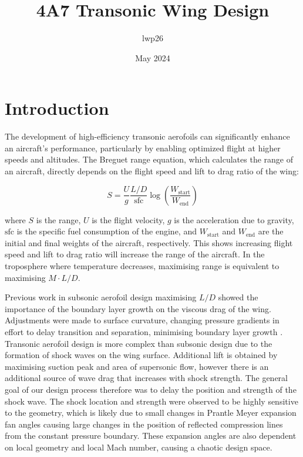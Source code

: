 \documentclass{article}
\begin{document}
\title{4A7 Transonic Wing Design}
\author{lwp26}
\date{May 2024}
\maketitle

\section{Introduction}

The development of high-efficiency transonic aerofoils can significantly enhance an aircraft's performance, particularly by enabling optimized flight at higher speeds and altitudes.
The Breguet range equation, which calculates the range of an aircraft, directly depends on the flight speed and lift to drag ratio of the wing:

\begin{equation}
S = \frac{U}{g}\frac{L/D}{\text{sfc}} \log \left( \frac{W_\text{start}}{W_\text{end}} \right)
\end{equation}

where $S$ is the range, $U$ is the flight velocity, $g$ is the acceleration due to gravity, $\text{sfc}$ is the specific fuel consumption of the engine, and $W_\text{start}$ and $W_\text{end}$ are the initial and final weights of the aircraft, respectively.
This shows increasing flight speed and lift to drag ratio will increase the range of the aircraft.
In the troposphere where temperature decreases, maximising range is equivalent to maximising $M \cdot L/D$.

Previous work in subsonic aerofoil design maximising $L/D$ showed the importance of the boundary layer growth on the viscous drag of the wing.
Adjustments were made to surface curvature, changing pressure gradients in effort to delay transition and separation, minimising boundary layer growth \cite{SA1_report}.
Transonic aerofoil design is more complex than subsonic design due to the formation of shock waves on the wing surface.
Additional lift is obtained by maximising suction peak and area of supersonic flow, however there is an additional source of wave drag that increases with shock strength.
The general goal of our design process therefore was to delay the position and strength of the shock wave.
The shock location and strength were observed to be highly sensitive to the geometry, which is likely due to small changes in Prantle Meyer
expansion fan angles causing large changes in the position of reflected compression lines from the constant pressure boundary.
These expansion angles are also dependent on local geometry and local Mach number, causing a chaotic design space.
\end{document}
